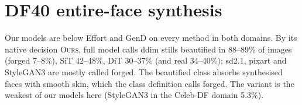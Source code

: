 \documentclass[10pt]{article}
\newcommand{\oursF}{\textsc{Ours}, full model}
\begin{document}
\section{DF40 entire-face synthesis}
\label{sec:efs}
\begin{table}[H]
\centering
\caption{DF40 entire-face synthesis, 300 images per method and domain (rng 0): share above the 95th percentile of same-domain DF40
real frames, FF++ / Celeb-DF domain (\%). Last row: share that \oursF{} sends to its beautified class by its native decision.
Descriptive probe, no bar. Generator stills against H.264 real frames is a confound.}
\label{tab:efs}
\scriptsize
\begin{adjustbox}{max width=\linewidth}\end{adjustbox}
\end{table}
Our models are below Effort and GenD on every method in both domains. By its native decision \oursF{} calls ddim stills beautified
in 88--89\% of images (forged 7--8\%), SiT 42--48\%, DiT 30--37\% (and real 34--40\%); sd2.1, pixart and StyleGAN3 are mostly called
forged. The beautified class absorbs synthesised faces with smooth skin, which the class definition calls forged. The variant is the
weakest of our models here (StyleGAN3 in the Celeb-DF domain 5.3\%).
\end{document}
